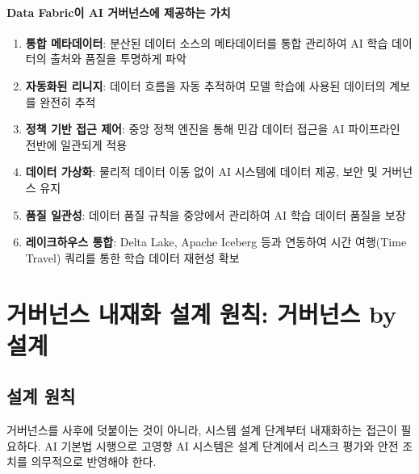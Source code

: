 \paragraph{Data Fabric이 AI 거버넌스에 제공하는 가치}

\begin{enumerate}
 \item \textbf{통합 메타데이터}: 분산된 데이터 소스의 메타데이터를 통합 관리하여 AI 학습 데이터의 출처와 품질을 투명하게 파악
 \item \textbf{자동화된 리니지}: 데이터 흐름을 자동 추적하여 모델 학습에 사용된 데이터의 계보를 완전히 추적
 \item \textbf{정책 기반 접근 제어}: 중앙 정책 엔진을 통해 민감 데이터 접근을 AI 파이프라인 전반에 일관되게 적용
 \item \textbf{데이터 가상화}: 물리적 데이터 이동 없이 AI 시스템에 데이터 제공, 보안 및 거버넌스 유지
 \item \textbf{품질 일관성}: 데이터 품질 규칙을 중앙에서 관리하여 AI 학습 데이터 품질을 보장
 \item \textbf{레이크하우스 통합}: Delta Lake, Apache Iceberg 등과 연동하여 시간 여행(Time Travel) 쿼리를 통한 학습 데이터 재현성 확보
\end{enumerate}


\section{거버넌스 내재화 설계 원칙: 거버넌스 by 설계}
\label{sec:13.2}

\subsection{설계 원칙}
\label{sec:13.2.1}

거버넌스를 사후에 덧붙이는 것이 아니라, 시스템 설계 단계부터 내재화하는 접근이 필요하다. AI 기본법 시행으로 고영향 AI 시스템은 설계 단계에서 리스크 평가와 안전 조치를 의무적으로 반영해야 한다.

